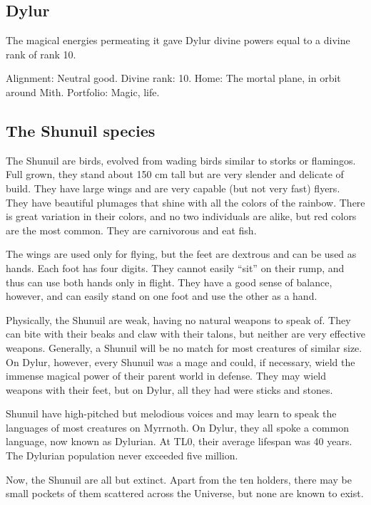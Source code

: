 \subsection{Dylur}

The magical energies permeating it gave Dylur divine powers equal to a divine rank of rank 10. 

Alignment: Neutral good. 
Divine rank: 10. 
Home: The mortal plane, in orbit around Mith. 
Portfolio: Magic, life. 

\subsection{The Shunuil species}

The Shunuil are birds, evolved from wading birds similar to storks or flamingos. Full grown, they stand about 150 cm tall but are very slender and delicate of build. They have large wings and are very capable (but not very fast) flyers. They have beautiful plumages that shine with all the colors of the rainbow. There is great variation in their colors, and no two individuals are alike, but red colors are the most common. They are carnivorous and eat fish. 

The wings are used only for flying, but the feet are dextrous and can be used as hands. Each foot has four digits. They cannot easily "`sit"' on their rump, and thus can use both hands only in flight. They have a good sense of balance, however, and can easily stand on one foot and use the other as a hand. 

Physically, the Shunuil are weak, having no natural weapons to speak of. They can bite with their beaks and claw with their talons, but neither are very effective weapons. Generally, a Shunuil will be no match for most creatures of similar size. On Dylur, however, every Shunuil was a mage and could, if necessary, wield the immense magical power of their parent world in defense. They may wield weapons with their feet, but on Dylur, all they had were sticks and stones.

Shunuil have high-pitched but melodious voices and may learn to speak the languages of most creatures on Myrrnoth. On Dylur, they all spoke a common language, now known as Dylurian. At TL0, their average lifespan was 40 years. The Dylurian population never exceeded five million. 

Now, the Shunuil are all but extinct. Apart from the ten holders, there may be small pockets of them scattered across the Universe, but none are known to exist. 
